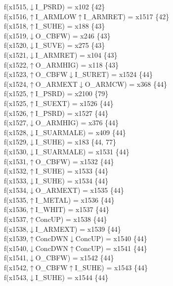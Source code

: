 f(x1515,$\downarrow$I\_PSRD) = x102 \{42\} \\  
f(x1516,$\uparrow$I\_ARMLOW$\uparrow$I\_ARMRET) = x1517 \{42\} \\  
f(x1518,$\uparrow$I\_SUHE) = x188 \{43\} \\  
f(x1519,$\downarrow$O\_CBFW) = x246 \{43\} \\  
f(x1520,$\downarrow$I\_SUVE) = x275 \{43\} \\  
f(x1521,$\downarrow$I\_ARMRET) = x104 \{43\} \\  
f(x1522,$\uparrow$O\_ARMHIG) = x118 \{43\} \\  
f(x1523,$\uparrow$O\_CBFW$\downarrow$I\_SURET) = x1524 \{44\} \\  
f(x1524,$\uparrow$O\_ARMEXT$\downarrow$O\_ARMCW) = x368 \{44\} \\  
f(x1525,$\uparrow$I\_PSRD) = x2100 \{79\} \\  
f(x1525,$\uparrow$I\_SUEXT) = x1526 \{44\} \\  
f(x1526,$\uparrow$I\_PSRD) = x1527 \{44\} \\  
f(x1527,$\downarrow$O\_ARMHIG) = x376 \{44\} \\  
f(x1528,$\downarrow$I\_SUARMALE) = x409 \{44\} \\  
f(x1529,$\downarrow$I\_SUHE) = x183 \{44, 77\} \\  
f(x1530,$\downarrow$I\_SUARMALE) = x1531 \{44\} \\  
f(x1531,$\uparrow$O\_CBFW) = x1532 \{44\} \\  
f(x1532,$\uparrow$I\_SUHE) = x1533 \{44\} \\  
f(x1533,$\downarrow$I\_SUHE) = x1534 \{44\} \\  
f(x1534,$\downarrow$O\_ARMEXT) = x1535 \{44\} \\  
f(x1535,$\uparrow$I\_METAL) = x1536 \{44\} \\  
f(x1536,$\uparrow$I\_WHIT) = x1537 \{44\} \\  
f(x1537,$\uparrow$ConcUP) = x1538 \{44\} \\  
f(x1538,$\downarrow$I\_ARMEXT) = x1539 \{44\} \\  
f(x1539,$\uparrow$ConcDWN$\downarrow$ConcUP) = x1540 \{44\} \\  
f(x1540,$\downarrow$ConcDWN$\uparrow$ConcUP) = x1541 \{44\} \\  
f(x1541,$\downarrow$O\_CBFW) = x1542 \{44\} \\  
f(x1542,$\uparrow$O\_CBFW$\uparrow$I\_SUHE) = x1543 \{44\} \\  
f(x1543,$\downarrow$I\_SUHE) = x1544 \{44\} \\  
